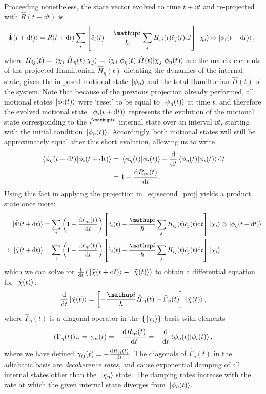 Proceeding nonetheless, the state vector evolved to time $t+\dd t$ and re-projected with $\hat R(t + \dd t)$ is
\begin{align}\label{eq:second_proj}
\ket{\tilde \Psi(t + \dd t)} &= 
\hat R(t + \dd t)
\sum_i
\left[\tilde c_i(t) - \frac\ii\hbar\sum_j H_{ij}(t)\tilde c_j(t)\dd t\right]
\ket{\chi_i}\otimes\ket{\phi_i(t + \dd t)},
\end{align}
where $H_{ij}(t) = \matrixel{\chi_i}{\hat H_{\eta}(t)}{\chi_j} = \matrixel{\chi_i\ \phi_\eta(t)}{\hat H(t)}{\chi_j\ \phi_\eta(t)}$ are the matrix elements of the projected Hamiltonian $\hat H_\eta(t)$ dictating the dynamics of the internal state, given the imposed motional state $\ket{\phi_\eta}$ and the total Hamiltonian $\hat H(t)$ of the system. Note that because of the previous projection already performed, all motional states $\ket{\phi_i(t)}$ were `reset' to be equal to $\ket{\phi_\eta(t)}$ at time $t$, and therefore the evolved motional state $\ket{\phi_i(t + \dd t)}$ represents the evolution of the motional state corresponding to the $i^\up{th}$ internal state over an interval $\dd t$, starting with the initial condition $\ket{\phi_\eta(t)}$. Accordingly, both motional states will still be approximately equal after this short evolution, allowing us to write
\begin{align}
\braket{\phi_\eta(t + \dd t)}{\phi_i(t + \dd t)} &= \braket{\phi_\eta(t)}{\phi_i(t)} + \dv{t}\braket{\phi_\eta(t)}{\phi_i(t)}\dd t\\
& = 1 + \dv{R_{\eta i}(t)}{t}.
\end{align}
Using this fact in applying the projection in~\eqref{eq:second_proj} yields a product state once more:
\begin{align}
\ket{\tilde \Psi(t + \dd t)} &= 
\sum_i
\left(1 + \dv{r_{\eta i}(t)}{t}\right)
\left[\tilde c_i(t) - \frac{\ii}\hbar\sum_j H_{ij}(t) \tilde c_j(t)\dd t\right]
\ket{\chi_i}\otimes\ket{\phi_\eta(t + \dd t)}\\
\Rightarrow \ket{\tilde \chi(t + \dd t)} &= \sum_i
\left(1 + \dv{r_{\eta i}(t)}{t}\right)
\left[\tilde c_i(t) - \frac{\ii}\hbar\sum_j H_{ij}(t) \tilde c_j(t)\dd t\right]
\ket{\chi_i}
\end{align}
which we can solve for $\frac1{\dd t}\left(\ket{\tilde \chi(t + \dd t)} - \ket{\tilde \chi(t)}\right)$ to obtain a differential equation for $\ket{\tilde \chi(t)}$:
\begin{align}
\dv{t} \ket{\tilde \chi(t)} =
\left[-\frac\ii\hbar\hat H_\eta(t) - \hat\Gamma_\eta(t)\right]\ket{\tilde\chi(t)},
\end{align}
where $\hat\Gamma_\eta(t)$ is a diagonal operator in the $\{\ket{\chi_i}\}$ basis with elements
\begin{align}
(\Gamma_\eta(t))_{ii} = \gamma_{\eta i}(t) = -\dv{R_{\eta i}(t)}{t} = -\dv{t} \braket{\phi_\eta(t)}{\phi_i(t)},
\end{align}
where we have defined $\gamma_{ij}(t) = -\dv{R_{ij}(t)}{t}$. The diagonals of $\hat \Gamma_\eta(t)$ in the adiabatic basis are \emph{decoherence rates}, and cause exponential damping of all internal states other than the $\ket{\chi_\eta}$ state. The damping rates increase with the rate at which the given internal state diverges from $\ket{\phi_\eta(t)}$.

